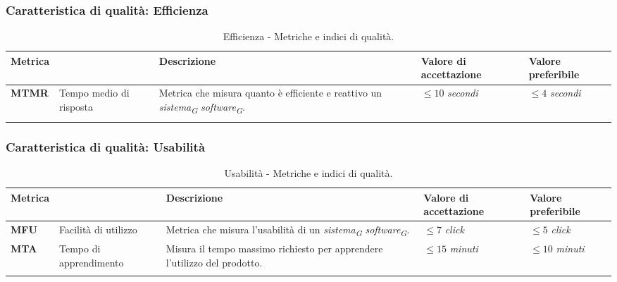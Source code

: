 \subsubsection{Caratteristica di qualità: Efficienza}
\begin{longtable}{|C{1.9cm}|L{4cm}|L{4cm}|L{2.2cm}|L{2.1cm}|}
    \hline
    \textbf{Metrica} &  & \textbf{Descrizione} & \textbf{Valore di \linebreak accettazione} & \textbf{Valore \linebreak preferibile} \\
    \hline \hline

    \textbf{MTMR} & Tempo medio di risposta & Metrica che misura quanto è efficiente e reattivo un \textit{sistema}\textsubscript{\textit{G}} \textit{software}\textsubscript{\textit{G}}. & $\leq 10$ \textit{secondi}  & $\leq 4$ \textit{secondi} \\
    \hline

    \caption{Efficienza - Metriche e indici di qualità.}
    \label{tab:metriche_efficienza_testo}
\end{longtable}

\vspace{0.5cm}

\subsubsection{Caratteristica di qualità: Usabilità}
\begin{longtable}{|C{1.9cm}|L{4cm}|L{4cm}|L{2.2cm}|L{2.1cm}|}
    \hline
    \textbf{Metrica} &  & \textbf{Descrizione} & \textbf{Valore di \linebreak accettazione} & \textbf{Valore \linebreak preferibile} \\
    \hline \hline

    \textbf{MFU} & Facilità di utilizzo & Metrica che misura l'usabilità di un \textit{sistema}\textsubscript{\textit{G}} \textit{software}\textsubscript{\textit{G}}. & $\leq 7$ \textit{click} & $\leq 5$ \textit{click} \\
    \hline

    \textbf{MTA} & Tempo di apprendimento & Misura il tempo massimo richiesto per apprendere l'utilizzo del prodotto. & $\leq 15$ \textit{minuti} & $\leq 10$ \textit{minuti} \\
    \hline

    \caption{Usabilità - Metriche e indici di qualità.}
    \label{tab:metriche_usabilità_testo}
\end{longtable}

